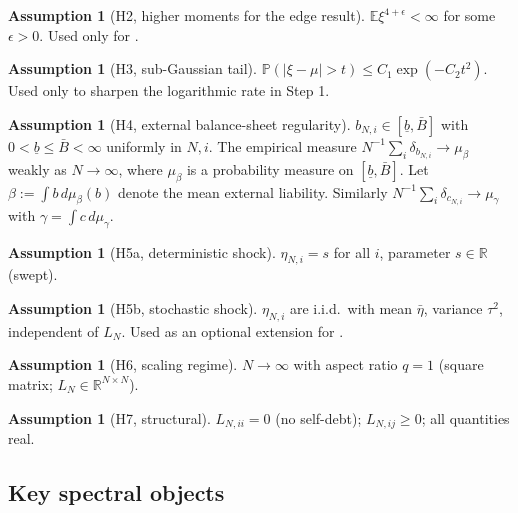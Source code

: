 \documentclass[11pt,a4paper]{article}
\theoremstyle{definition}
\newtheorem{assumption}[theorem]{Assumption}
\begin{document}
\begin{assumption}[H2, higher moments for the edge result]
\label{ass:H2}
$\mathbb E\xi^{4+\epsilon}<\infty$ for some $\epsilon>0$. Used only for
.
\end{assumption}

\begin{assumption}[H3, sub-Gaussian tail]
\label{ass:H3}
$\mathbb P(|\xi-\mu|>t)\leq C_1\exp(-C_2 t^2)$. Used only to sharpen the
logarithmic rate in  Step 1.
\end{assumption}

\begin{assumption}[H4, external balance-sheet regularity]
\label{ass:H4}
$b_{N,i}\in[\underline b,\bar B]$ with $0<\underline b\leq\bar B<\infty$
uniformly in $N,i$. The empirical measure
$N^{-1}\sum_i\delta_{b_{N,i}}\to\mu_\beta$ weakly as $N\to\infty$, where
$\mu_\beta$ is a probability measure on $[\underline b,\bar B]$. Let
$\beta := \int b\,d\mu_\beta(b)$ denote the mean external liability. Similarly
$N^{-1}\sum_i\delta_{c_{N,i}}\to\mu_\gamma$ with
$\gamma = \int c\,d\mu_\gamma$.
\end{assumption}

\begin{assumption}[H5a, deterministic shock]
\label{ass:H5a}
$\eta_{N,i} = s$ for all $i$, parameter $s\in\mathbb{R}$ (swept).
\end{assumption}

\begin{assumption}[H5b, stochastic shock]
\label{ass:H5b}
$\eta_{N,i}$ are i.i.d.\ with mean $\bar\eta$, variance $\tau^2$, independent
of $L_N$. Used as an optional extension for .
\end{assumption}

\begin{assumption}[H6, scaling regime]
\label{ass:H6}
$N\to\infty$ with aspect ratio $q = 1$ (square matrix; $L_N\in\mathbb{R}^{N\times N}$).
\end{assumption}

\begin{assumption}[H7, structural]
\label{ass:H7}
$L_{N,ii} = 0$ (no self-debt); $L_{N,ij}\geq 0$; all quantities real.
\end{assumption}

\subsection{Key spectral objects}
\end{document}
